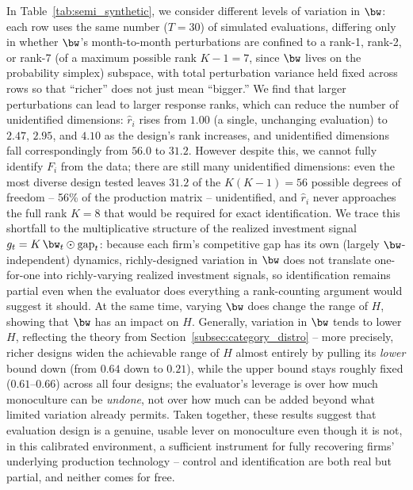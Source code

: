 In Table~\ref{tab:semi_synthetic}, we consider different levels of variation in $\bw$: each row uses the same number ($T=30$) of simulated evaluations, differing only in whether $\bw$'s month-to-month perturbations are confined to a rank-1, rank-2, or rank-7 (of a maximum possible rank $K-1=7$, since $\bw$ lives on the probability simplex) subspace, with total perturbation variance held fixed across rows so that ``richer'' does not just mean ``bigger.''
We find that larger perturbations can lead to larger response ranks, which can reduce the number of unidentified dimensions: $\hat r_i$ rises from $1.00$ (a single, unchanging evaluation) to $2.47$, $2.95$, and $4.10$ as the design's rank increases, and unidentified dimensions fall correspondingly from $56.0$ to $31.2$.
However despite this, we cannot fully identify $F_i$ from the data; there are still many unidentified dimensions: even the most diverse design tested leaves $31.2$ of the $K(K-1)=56$ possible degrees of freedom -- 56\% of the production matrix -- unidentified, and $\hat r_i$ never approaches the full rank $K=8$ that would be required for exact identification. We trace this shortfall to the multiplicative structure of the realized investment signal $g_t=K\,\bw_t\odot\mathrm{gap}_t$: because each firm's competitive gap has its own (largely $\bw$-independent) dynamics, richly-designed variation in $\bw$ does not translate one-for-one into richly-varying realized investment signals, so identification remains partial even when the evaluator does everything a rank-counting argument would suggest it should.
At the same time, varying $\bw$ does change the range of $H$, showing that $\bw$ has an impact on $H$.
Generally, variation in $\bw$ tends to lower $H$, reflecting the theory from Section~\ref{subsec:category_distro} -- more precisely, richer designs widen the achievable range of $H$ almost entirely by pulling its \emph{lower} bound down (from $0.64$ down to $0.21$), while the upper bound stays roughly fixed ($0.61$--$0.66$) across all four designs; the evaluator's leverage is over how much monoculture can be \emph{undone}, not over how much can be added beyond what limited variation already permits.
Taken together, these results suggest that evaluation design is a genuine, usable lever on monoculture even though it is not, in this calibrated environment, a sufficient instrument for fully recovering firms' underlying production technology -- control and identification are both real but partial, and neither comes for free.
